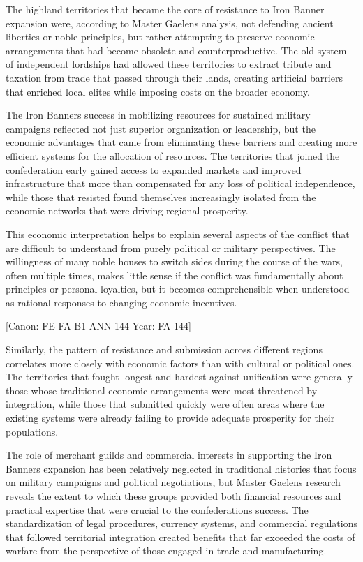 The highland territories that became the core of resistance to Iron
Banner expansion were, according to Master Gaelen\textquotesingle s
analysis, not defending ancient liberties or noble principles, but
rather attempting to preserve economic arrangements that had become
obsolete and counterproductive. The old system of independent lordships
had allowed these territories to extract tribute and taxation from trade
that passed through their lands, creating artificial barriers that
enriched local elites while imposing costs on the broader economy.

The Iron Banner\textquotesingle s success in mobilizing resources for
sustained military campaigns reflected not just superior organization or
leadership, but the economic advantages that came from eliminating these
barriers and creating more efficient systems for the allocation of
resources. The territories that joined the confederation early gained
access to expanded markets and improved infrastructure that more than
compensated for any loss of political independence, while those that
resisted found themselves increasingly isolated from the economic
networks that were driving regional prosperity.

This economic interpretation helps to explain several aspects of the
conflict that are difficult to understand from purely political or
military perspectives. The willingness of many noble houses to switch
sides during the course of the wars, often multiple times, makes little
sense if the conflict was fundamentally about principles or personal
loyalties, but it becomes comprehensible when understood as rational
responses to changing economic incentives.

{[}Canon: FE-FA-B1-ANN-144 \textbar{} Year: FA 144{]}

Similarly, the pattern of resistance and submission across different
regions correlates more closely with economic factors than with cultural
or political ones. The territories that fought longest and hardest
against unification were generally those whose traditional economic
arrangements were most threatened by integration, while those that
submitted quickly were often areas where the existing systems were
already failing to provide adequate prosperity for their populations.

The role of merchant guilds and commercial interests in supporting the
Iron Banner\textquotesingle s expansion has been relatively neglected in
traditional histories that focus on military campaigns and political
negotiations, but Master Gaelen\textquotesingle s research reveals the
extent to which these groups provided both financial resources and
practical expertise that were crucial to the
confederation\textquotesingle s success. The standardization of legal
procedures, currency systems, and commercial regulations that followed
territorial integration created benefits that far exceeded the costs of
warfare from the perspective of those engaged in trade and
manufacturing.

